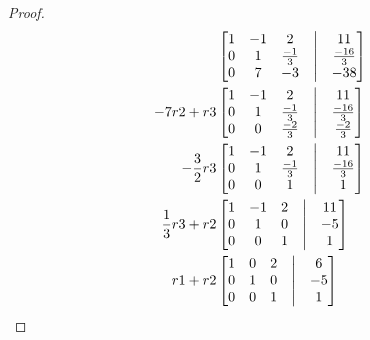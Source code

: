 \documentclass[12pt]{article}
\begin{document}
\begin{proof}
\begin{align*}
                 &
                \begin{bmatrix}
                        1 & -1 & 2            & \bigm| & 11            \\
                        0 & 1  & \frac{-1}{3} & \bigm| & \frac{-16}{3} \\
                        0 & 7  & -3           & \bigm| & -38           \\
                \end{bmatrix} \\
                -7r2+r3
                 &
                \begin{bmatrix}
                        1 & -1 & 2            & \bigm| & 11            \\
                        0 & 1  & \frac{-1}{3} & \bigm| & \frac{-16}{3} \\
                        0 & 0  & \frac{-2}{3} & \bigm| & \frac{-2}{3}  \\
                \end{bmatrix} \\
                -\frac{3}{2}r3
                 &
                \begin{bmatrix}
                        1 & -1 & 2            & \bigm| & 11            \\
                        0 & 1  & \frac{-1}{3} & \bigm| & \frac{-16}{3} \\
                        0 & 0  & 1            & \bigm| & 1             \\
                \end{bmatrix} \\
                \frac{1}{3}r3+r2
                 &
                \begin{bmatrix}
                        1 & -1 & 2 & \bigm| & 11 \\
                        0 & 1  & 0 & \bigm| & -5 \\
                        0 & 0  & 1 & \bigm| & 1  \\
                \end{bmatrix} \\
                r1 + r2
                 &
                \begin{bmatrix}
                        1 & 0 & 2 & \bigm| & 6  \\
                        0 & 1 & 0 & \bigm| & -5 \\
                        0 & 0 & 1 & \bigm| & 1  \\
                \end{bmatrix} \\

\end{align*}
\end{proof}
\end{document}
